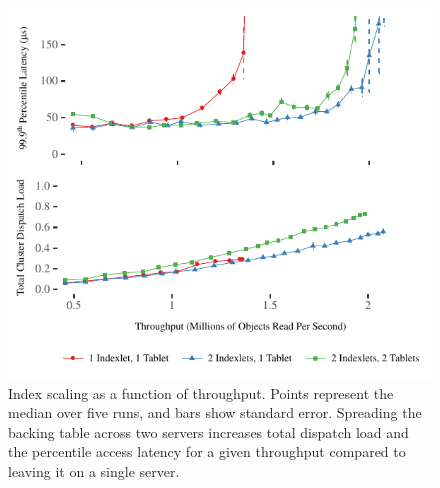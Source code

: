 \begin{figure}[t]
\includegraphics[width=\columnwidth]{graphs/index-motivation}
\caption{Index scaling as a function of throughput. Points represent
    the median over five runs, and bars show standard error. Spreading the
    backing table across two servers increases total dispatch load and
    the \nnnth percentile access latency for a given throughput compared
    to leaving it on a single server.}
\label{fig:index-load}
\end{figure}
